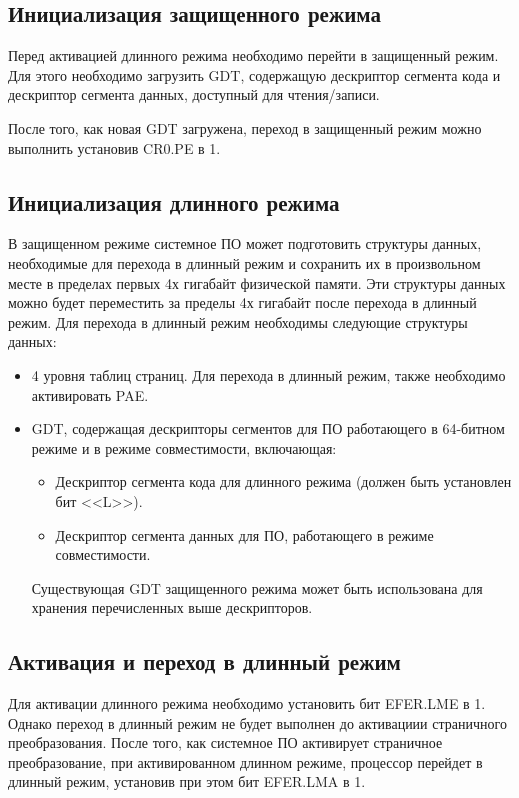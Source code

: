 \subsection{Инициализация защищенного режима}
Перед активацией длинного режима необходимо перейти в защищенный режим.
Для этого необходимо загрузить GDT, содержащую дескриптор сегмента кода и
дескриптор сегмента данных, доступный для чтения/записи.

После того, как новая GDT загружена, переход в защищенный режим можно выполнить установив CR0.PE в 1.

\subsection{Инициализация длинного режима}
В защищенном режиме системное ПО может подготовить структуры данных, необходимые для перехода в
длинный режим и сохранить их в произвольном месте в пределах первых 4х гигабайт физической памяти.
Эти структуры данных можно будет переместить за пределы 4х гигабайт после перехода в длинный режим.
Для перехода в длинный режим необходимы следующие структуры данных:
\begin{itemize}
\item 4 уровня таблиц страниц. Для перехода в длинный режим, также необходимо активировать PAE.
\item GDT, содержащая дескрипторы сегментов для ПО работающего в 64-битном режиме и в
	режиме совместимости, включающая:
	\begin{itemize}
	\item Дескриптор сегмента кода для длинного режима (должен быть установлен бит <<L>>).
	\item Дескриптор сегмента данных для ПО, работающего в режиме совместимости.
	\end{itemize}

	Существующая GDT защищенного режима может быть использована для хранения перечисленных
	выше дескрипторов.
\end{itemize}

\subsection{Активация и переход в длинный режим}
Для активации длинного режима необходимо установить бит EFER.LME в 1. Однако переход в длинный режим
не будет выполнен до активациии страничного преобразования. После того, как системное ПО
активирует страничное преобразование, при активированном длинном режиме, процессор перейдет в
длинный режим, установив при этом бит EFER.LMA в 1.

